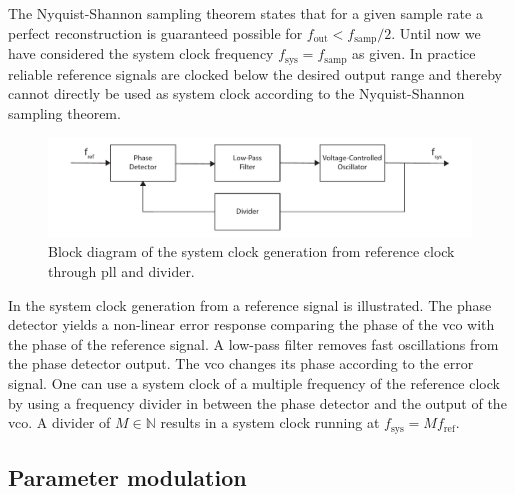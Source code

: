 The Nyquist-Shannon sampling theorem states that for a given sample rate a
perfect reconstruction is guaranteed possible for
$f_\text{out}<f_\text{samp}/2$. Until now we have considered the system clock
frequency $f_\text{sys}=f_\text{samp}$ as given. In practice reliable
reference signals are clocked below the desired output range and thereby
cannot directly be used as system clock according to the Nyquist-Shannon
sampling theorem.
\begin{figure}[htb]
  \centering
  \includegraphics[width=\textwidth]
  {../figure/digital-signal-synthesis/clock-generation.pdf}
  \caption{Block diagram of the system clock generation from reference
    clock through \gls{pll} and divider.
    }\label{fig:dds_clock_generation}
\end{figure}
In  the system clock generation from a
reference signal is illustrated. The phase detector yields a non-linear error
response comparing the phase of the \gls{vco} with the phase of the reference
signal. A low-pass filter removes fast oscillations from the phase detector
output. The \gls{vco} changes its phase according to the error signal. One can
use a system clock of a multiple frequency of the reference clock by using
a frequency divider in between the phase detector and the output of the
\gls{vco}. A divider of $M\in\mathbb{N}$ results in a system clock running
at $f_\text{sys}=Mf_\text{ref}$.

\subsection{Parameter modulation}

